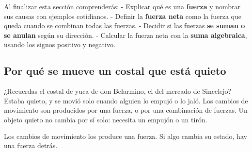 \documentclass[
  spanish,
  letterpaper,
  12pt,
  oneside,
  open=any,
  DIV=15]{scrbook}
\begin{document}
\begin{tcolorbox}[enhanced jigsaw, arc=.35mm, bottomrule=.15mm, bottomtitle=1mm, breakable, colback=white, colbacktitle=quarto-callout-important-color!10!white, colframe=quarto-callout-important-color-frame, coltitle=black, left=2mm, leftrule=.75mm, opacityback=0, opacitybacktitle=0.6, rightrule=.15mm, title=\textcolor{quarto-callout-important-color}{\faExclamation}\hspace{0.5em}{Conceptos Clave (Objetivos de Aprendizaje)}, titlerule=0mm, toprule=.15mm, toptitle=1mm]

Al finalizar esta sección comprenderás: - Explicar qué es una
\textbf{fuerza} y nombrar sus causas con ejemplos cotidianos. - Definir
la \textbf{fuerza neta} como la fuerza que queda cuando se combinan
todas las fuerzas. - Decidir si las fuerzas \textbf{se suman o se
anulan} según su dirección. - Calcular la fuerza neta con la
\textbf{suma algebraica}, usando los signos positivo y negativo.

\end{tcolorbox}

\subsection{Por qué se mueve un costal que está
quieto}\label{por-quuxe9-se-mueve-un-costal-que-estuxe1-quieto}

¿Recuerdas el costal de yuca de don Belarmino, el del mercado de
Sincelejo? Estaba quieto, y se movió solo cuando alguien lo empujó o lo
jaló. Los cambios de movimiento son producidos por una fuerza, o por una
combinación de fuerzas. Un objeto quieto no cambia por sí solo: necesita
un empujón o un tirón.

\begin{tcolorbox}[enhanced jigsaw, arc=.35mm, bottomrule=.15mm, bottomtitle=1mm, breakable, colback=white, colbacktitle=quarto-callout-important-color!10!white, colframe=quarto-callout-important-color-frame, coltitle=black, left=2mm, leftrule=.75mm, opacityback=0, opacitybacktitle=0.6, rightrule=.15mm, title=\textcolor{quarto-callout-important-color}{\faExclamation}\hspace{0.5em}{Regla de Oro (Concepto Clave)}, titlerule=0mm, toprule=.15mm, toptitle=1mm]

Los cambios de movimiento los produce una fuerza. Si algo cambia su
estado, hay una fuerza detrás.

\end{tcolorbox}
\end{document}
